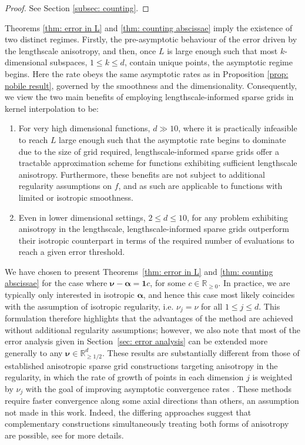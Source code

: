\documentclass[pdflatex,sn-mathphys-num]{sn-jnl}%
\theoremstyle{thmstyleone}%
\theoremstyle{thmstyletwo}%
\theoremstyle{thmstylethree}%
\begin{document}
\begin{proof}
    See Section \ref{subsec: counting}.
\end{proof}
Theorems \ref{thm: error in L} and \ref{thm: counting abscissae} imply the existence of two distinct regimes. Firstly, the pre-asymptotic behaviour of the error driven by the lengthscale anisotropy, and then, once \(L\) is large enough such that most \(k\)-dimensional subspaces, \(1\leq k\leq d\), contain unique points, the asymptotic regime begins. Here the rate obeys the same asymptotic rates as in Proposition \ref{prop: nobile result}, governed by the smoothness and the dimensionality. Consequently, we view the two main benefits of employing lengthscale-informed sparse grids in kernel interpolation to be:
\begin{enumerate}
    \item For very high dimensional functions, \(d\gg10\), where it is practically infeasible to reach \(L\) large enough such that the asymptotic rate begins to dominate due to the size of grid required, lengthscale-informed sparse grids offer a tractable approximation scheme for functions exhibiting sufficient lengthscale anisotropy. Furthermore, these benefits are not subject to additional regularity assumptions on \(f\), and as such are applicable to functions with limited or isotropic smoothness.
    \item Even in lower dimensional settings, \(2\leq d\leq10\), for any problem exhibiting anisotropy in the lengthscale, lengthscale-informed sparse grids outperform their isotropic counterpart in terms of the required number of evaluations to reach a given error threshold.
\end{enumerate}

We have chosen to present Theorems~\ref{thm: error in L} and \ref{thm: counting abscissae} for the case where \(\boldsymbol{\nu}-\boldsymbol{{\alpha}}=\mathbf{1}c\), for some \(c\in\mathbb{R}_{\geq0}\). In practice, we are typically only interested in isotropic \(\boldsymbol{\alpha}\), and hence this case most likely coincides with the assumption of isotropic regularity, i.e. \(\nu_j=\nu\) for all \(1\leq j\leq d\). This formulation therefore highlights that the advantages of the method are achieved without additional regularity assumptions; however, we also note that most of the error analysis given in Section~\ref{sec: error analysis} can be extended more generally to any \(\boldsymbol{\nu}\in\mathbb{R}_{\geq1/2}^d\). These results are substantially different from those of established anisotropic sparse grid constructions targeting anisotropy in the regularity, in which the rate of growth of points in each dimension \(j\) is weighted by \(\nu_j\) with the goal of improving asymptotic convergence rates \cite{Nobile2008, Rieger2019}. These methods require faster convergence along some axial directions than others, an assumption not made in this work. Indeed, the differing approaches suggest that complementary constructions simultaneously treating both forms of anisotropy are possible, see \cite{addy2026thesis} for more details.
\end{document}
